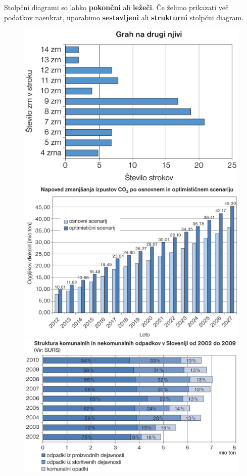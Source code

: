                 Stolpčni diagrami so lahko \textbf{pokončni} ali \textbf{ležeči}. 
                Če želimo prikazati več podatkov naenkrat, uporabimo \textbf{sestavljeni} ali \textbf{strukturni} stolpčni diagram.
            
                
                \begin{figure}[H]
                    \includegraphics[scale=0.3]{../Slike_in_skice/1093.jpg}
                    \includegraphics[scale=0.22]{../Slike_in_skice/1095.jpg}
                    \includegraphics[scale=0.22]{../Slike_in_skice/1097.jpg} 

\end{figure}
